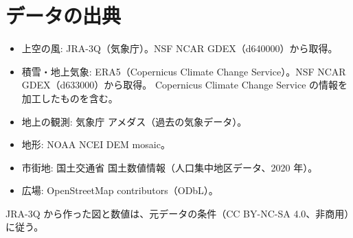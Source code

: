 \section*{データの出典}
\begin{itemize}
  \item 上空の風: JRA-3Q（気象庁）。NSF NCAR GDEX（d640000）から取得。
  \item 積雪・地上気象: ERA5（Copernicus Climate Change Service）。NSF NCAR GDEX（d633000）から取得。
    Copernicus Climate Change Service の情報を加工したものを含む。
  \item 地上の観測: 気象庁 アメダス（過去の気象データ）。
  \item 地形: NOAA NCEI DEM mosaic。
  \item 市街地: 国土交通省 国土数値情報（人口集中地区データ、2020 年）。
  \item 広場: \textcopyright{} OpenStreetMap contributors（ODbL）。
\end{itemize}
JRA-3Q から作った図と数値は、元データの条件（CC BY-NC-SA 4.0、非商用）に従う。
